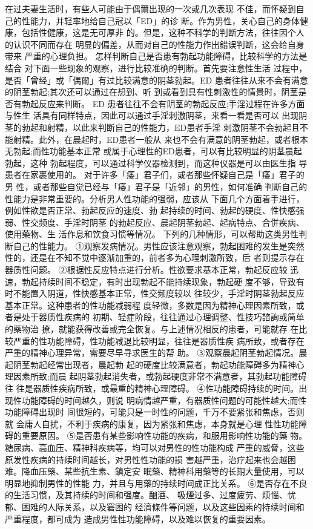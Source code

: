 \documentclass[12pt,UTF8]{ctexbook}
\begin{document}
在过夫妻生活时，有些人可能由于偶爾出现的一次或几次表现
不佳，而怀疑到自己的性能力，并轻率地给自己冠以「ED」的诊
断。作为男性，关心自己的身体健康，包括性健康，这是无可厚非
的。但是，这种不科学的判断方法，往往因个人的认识不同而存在
明显的偏差，从而对自己的性能力作出錯误判断，这会给自身带来
严重的心理负担。
怎样判断自己是否患有勃起功能障碍，比较科学的方法是结合
对下面一些现象的观察，进行比较准确的判断。首先要注意性生活
过程中，是否「曾经」或「偶爾」有过比较满意的阴茎勃起。ED
患者往往从来不会有满意的阴茎勃起;其次还可以通过在想到、听
到或看到具有性刺激性的情景时，阴茎是否有勃起反应来判断。
ED 患者往往不会有阴茎的勃起反应;手淫过程在许多方面与性生
活具有同样特点，因此可以通过手淫刺激阴茎，来看一看是否可以
出现阴茎的勃起和射精，以此来判断自己的性能力，ED患者手淫
刺激阴茎不会勃起且不能射精。此外，在晨起时，ED患者一般从
来也不会有满意的阴茎勃起，或者根本无勃起;而性功能基本正常
或属于心理性的ED患者，可以有比较明显的阴茎晨起勃起，这种
勃起程度，可以通过科学仪器检测到，而这种仪器是可以由医生指
导患者在家裹使用的。
对于许多「痿」君子们，或者那些怀疑自己是「痿」君子的男
性，或者那些自觉已经与「痿」君子是「近邻」的男性，如何准确
判断自己的性能力是非常重要的。分析男人性功能的强弱，应该从
下面几个方面着手进行，例如性欲是否正常、勃起反应的速度、勃
起持续的时间、勃起的硬度、性快感强弱、性交频度、手淫时阴茎
的勃起反应、晨起阴茎勃起、起病特点、合併疾病、使用藥物、生
活作息和饮食习惯等情况。
下列的几种情形，可以帮助这类男性判断自己的性能力。
①观察发病情况。男性应该注意观察，勃起困难的发生是突然
性的，还是在不知不觉中逐渐加重的，前者多为心理刺激所致，后
者则提示存在器质性问题。
②根据性反应特点进行分析。性欲要求基本正常，勃起反应较
迅速，勃起持续时间不稳定，有时出现勃起不能持续现象，勃起硬
度不够，导致有时不能置入阴道，性快感基本正常，性交频度较以
往较少，手淫时阴茎勃起反应基本正常。这种患者的性功能减弱程
度轻微，多数是因为精神心理因素所致，或者是处于器质性疾病的
初期、轻症阶段，往往通过心理调整、性技巧諮詢或简单的藥物治
撩，就能获得改善或完全恢复。与上述情况相反的患者，可能就存
在比较严重的性功能障碍，性功能减退比较明显，往往是器质性疾
病所致，或者存在严重的精神心理异常，需要尽早寻求医生的帮
助。
③观察晨起阴茎勃起情况。晨起阴茎勃起经常出现者，晨起勃
起的硬度比较满意者，勃起功能障碍多为精神心理因素所致;而晨
起阴茎勃起消失者，或勃起硬度非常不满意者，其勃起功能障碍往
往是器质性疾病所致，或最重的精神心理障碍。
④性功能障碍持续的时间。出现性功能障碍的时间越久，则说
明病情越严重，有器质性问题的可能性越大;而性功能障碍出现时
间很短的，可能只是一时性的问题，千万不要紧张和焦虑，否则就
会庸人自扰，不利于疾病的康复，因为紧张和焦虑，本身就是心理
性性功能障碍的重要原因。
⑤是否患有某些影响性功能的疾病，和服用影响性功能的藥
物。糖尿病、高血压、精神科疾病等，均可以对男性的性功能构成
严重的威脅，这些原发性疾病的持续时间越长，对男性性功能的损
害越严重，治疗起来也会越困难。降血压藥、某些抗生素、鎮定安
眠藥、精神科用藥等的长期大量使用，可以明显地抑制男性的性能
力，并且与用藥的持续时间成正比关系。
⑥是否存在不良的生活习惯，及其持续的时间和强度。酗酒、
吸煙过多、过度疲劳、烦惱、忧郁、困难的人际关系，以及窘困的
经濟條件等问题，以及这些因素的持续时间和严重程度，都可成为
造成男性性功能障碍，以及难以恢复的重要因素。
\end{document}

